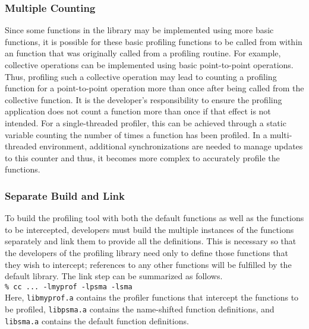 \subsubsection{Multiple Counting}
\label{sec:pshmem_multiple_count}
Since some functions in the \openshmem library may be implemented
using more basic \openshmem functions, it is possible for these basic
profiling functions to be called from within an \openshmem function
that was originally called from a profiling routine. For example,
\openshmem collective operations can be implemented using basic
point-to-point operations. Thus, profiling such a collective
operation may lead to counting a profiling function for a
point-to-point operation more than once after being called from the
collective function. It is the developer's responsibility to ensure
the profiling application does not count a function more than once if
that effect is not intended. For a single-threaded profiler, this
can be achieved through a static variable counting the number of
times a function has been profiled. In a multi-threaded environment,
additional synchronizations are needed to manage updates to this
counter and thus, it becomes more complex to accurately profile the
\openshmem functions.

\subsubsection{Separate Build and Link}
\label{sec:pshmem_separate_build_link}
To build the profiling tool with both the default \openshmem
functions as well as the \openshmem functions to be intercepted,
developers must build the multiple instances of the \openshmem
functions separately and link them to provide all the definitions.
This is necessary so that the developers of the profiling library
need only to define those \openshmem functions that they wish
to intercept; references to any other functions will be fulfilled
by the default \openshmem library. The link step can be summarized
as follows. \\

\noindent\texttt{\% cc ... -lmyprof -lpsma -lsma} \\

Here, \texttt{libmyprof.a} contains the profiler functions that
intercept the \openshmem functions to be profiled,
\texttt{libpsma.a} contains the name-shifted \openshmem function
definitions, and \texttt{libsma.a} contains the default \openshmem
function definitions.

